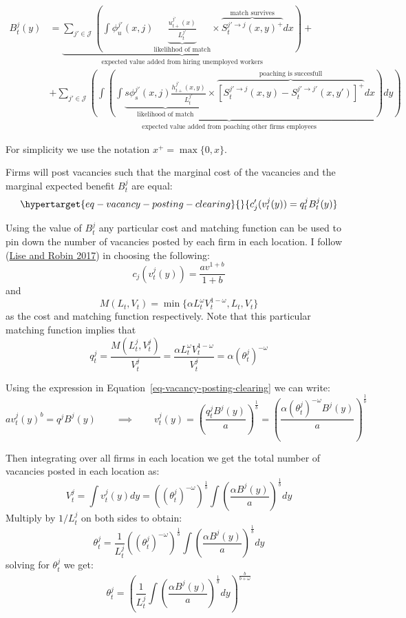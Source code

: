 \documentclass[
  letterpaper,
  DIV=11,
  numbers=noendperiod]{scrreprt}
\begin{document}
\begin{align}
B^j_t(y) &= \underbrace{\sum_{j'\in \mathcal{J}}\left( \int\phi_u^{j'}(x,j)\underbrace{\frac{u^{j'}_{t+}(x)}{L^{j'}_t}}_{\text{likelihhod of match}}\times\overbrace{  S_t^{j'\to j}(x,y)^{+} }^{\text{match survives}}dx\right)}_{\text{expected value added from hiring unemployed workers}} + \nonumber \\
& +\underbrace{\sum_{j'\in \mathcal{J}}\left(\int \left(\int\underbrace{s\phi_s^{j'}(x,j)\frac{h^{j'}_{t+}(x,y)}{L^{j'}_t}}_{\text{likelihood of match}}\times \overbrace{ [S^{j' \to j}_t(x,y)-S^{j' \to j'}_{t}(x,y')]^{+}}^{\text{poaching is succesfull}}dx\right)dy\right)}_{\text{expected value added from poaching other firms employees}}
\end{align}

For simplicity we use the notation \(x^+ = \max\{0,x\}\).

Firms will post vacancies such that the marginal cost of the vacancies
and the marginal expected benefit \(B^j_t\) are equal:
\begin{equation}\protect\hypertarget{eq-vacancy-posting-clearing}{}{c_{j}'(v^{j}_t(y))=q^{j}_{t}B^{j}_{t}(y)}\label{eq-vacancy-posting-clearing}\end{equation}

Using the value of \(B^j_t\) any particular cost and matching function
can be used to pin down the number of vacancies posted by each firm in
each location. I follow
(\protect\hyperlink{ref-liseMacrodynamicsSortingWorkers2017}{Lise and
Robin 2017}) in choosing the following:
\[c_{j}(v^{j}_t(y)) = \frac{a v^{1+b}}{1+b}\] and
\[M(L_t, V_t) = \min\{\alpha L_t^{\omega} V_t^{1 - \omega}, L_t, V_t \}\]
as the cost and matching function respectively. Note that this
particular matching function implies that
\[q^j_t = \frac{M(L^j_t, V^j_t)}{V^j_t}=\frac{\alpha L_t^{\omega} V_t^{1 - \omega}}{V^j_t}= \alpha(\theta_t^j)^{-\omega}\]

Using the expression in Equation~\ref{eq-vacancy-posting-clearing} we
can write:
\[a v^{j}_t(y)^{b} = q^j B^j(y) \qquad \implies \qquad  v^{j}_t(y) = \left(\frac{q_t^j B^j(y)}{a}\right)^{\frac{1}{b}} = \left(\frac{\alpha(\theta_t^j)^{-\omega} B^j(y)}{a}\right)^{\frac{1}{b}} \]

Then integrating over all firms in each location we get the total number
of vacancies posted in each location as:
\[V_t^j = \int v^j_t(y)dy = \left((\theta_t^j)^{-\omega}\right)^{\frac{1}{b}}\int\left(\frac{\alpha B^j(y)}{a}\right)^{\frac{1}{b}}dy\]
Multiply by \(1/L^j_t\) on both sides to obtain:
\[\theta^j_t = \frac{1}{L^j_t}\left((\theta_t^j)^{-\omega}\right)^{\frac{1}{b}}\int\left(\frac{\alpha B^j(y)}{a}\right)^{\frac{1}{b}}dy\]
solving for \(\theta^j_t\) we get:
\[\theta^j_t = \left(\frac{1}{L^j_t}\int\left(\frac{\alpha B^j(y)}{a}\right)^{\frac{1}{b}}dy\right)^{\frac{b}{b+\omega}}\]
\end{document}
